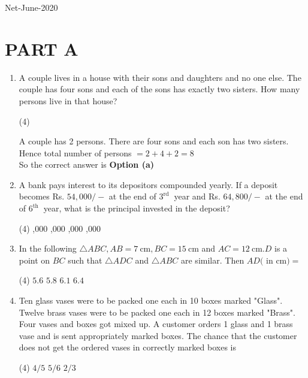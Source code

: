 \begin{abox}
	Net-June-2020
	\end{abox}
\section{PART A}
\begin{enumerate}
	\item A couple lives in a house with their sons and daughters and no one else. The couple has four sons and each of the sons has exactly two sisters. How many persons live in that house?
	 \begin{tasks}(4)
	\end{tasks}
\begin{answer}
 A couple has 2 persons. There are four sons and each son has two sisters. Hence total number of persons $=2+4+2=8$\\
		So the correct answer is \textbf{Option (a)}
\end{answer}
\item A bank pays interest to its depositors compounded yearly. If a deposit becomes Rs. $54,000 /-$ at the end of $3^{\text {rd }}$ year and Rs. $64,800 /-$ at the end of $6^{\text {th }}$ year, what is the principal invested in the deposit?
 \begin{tasks}(4)
	,000
	,000
	,000
	,000
\end{tasks}
\item In the following $\triangle A B C, A B=7 \mathrm{~cm}, B C=15 \mathrm{~cm}$ and $A C=12 \mathrm{~cm} . D$ is a point on $B C$ such that $\triangle A D C$ and $\triangle A B C$ are similar. Then $A D($ in $\mathrm{cm})=$		
 \begin{tasks}(4)
	\task[\textbf{a.}]$5.6$
	\task[\textbf{b.}]$5.8$
	\task[\textbf{c.}] $6.1$
	\task[\textbf{d.}]$6.4$ 
\end{tasks}
\item Ten glass vases were to be packed one each in 10 boxes marked "Glass". Twelve brass vases were to be packed one each in 12 boxes marked "Brass". Four vases and boxes got mixed up. A customer orders 1 glass and 1 brass vase and is sent appropriately marked boxes. The chance that the customer does not get the ordered vases in correctly marked boxes is
 \begin{tasks}(4)
	\task[\textbf{a.}]$4 / 5$
	\task[\textbf{b.}]$5 / 6$
	\task[\textbf{c.}]$2 / 3$

\end{tasks}
\end{enumerate}
